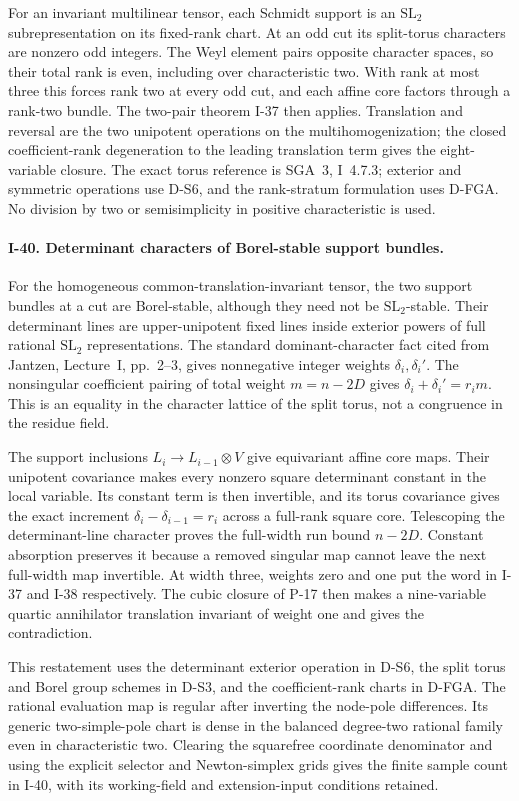For an invariant multilinear tensor, each Schmidt support is
an $\mathrm{SL}_2$ subrepresentation on its fixed-rank chart.
At an odd cut its split-torus characters are nonzero odd
integers. The Weyl element pairs opposite character spaces, so their total rank is even, including over characteristic two.
With rank at most three this forces rank two at every odd cut,
and each affine core factors through a rank-two bundle.
The two-pair theorem I-37 then applies. Translation and reversal
are the two unipotent operations on the multihomogenization;
the closed coefficient-rank degeneration to the leading
translation term gives the eight-variable closure. The exact
torus reference is SGA~3, I~4.7.3; exterior and symmetric
operations use D-S6, and the rank-stratum formulation uses
D-FGA. No division by two or semisimplicity in positive
characteristic is used.

\paragraph{I-40. Determinant characters of Borel-stable support bundles.}
For the homogeneous common-translation-invariant tensor, the
two support bundles at a cut are Borel-stable, although they
need not be $\mathrm{SL}_2$-stable. Their determinant lines
are upper-unipotent fixed lines inside exterior powers of
full rational $\mathrm{SL}_2$ representations. The standard
dominant-character fact cited from Jantzen, Lecture~I,
pp.~2--3, gives nonnegative integer weights $\delta_i,\delta_i'$.
The nonsingular coefficient pairing of total weight $m=n-2D$
gives $\delta_i+\delta_i'=r_i m$. This is an equality in the
character lattice of the split torus, not a congruence in
the residue field.

The support inclusions $L_i\to L_{i-1}\otimes V$ give
equivariant affine core maps. Their unipotent covariance
makes every nonzero square determinant constant in the local
variable. Its constant term is then invertible, and its
torus covariance gives the exact increment
$\delta_i-\delta_{i-1}=r_i$ across a full-rank square core.
Telescoping the determinant-line character proves the
full-width run bound $n-2D$. Constant absorption preserves
it because a removed singular map cannot leave the next
full-width map invertible. At width three, weights zero and
one put the word in I-37 and I-38 respectively. The cubic
closure of P-17 then makes a nine-variable quartic annihilator
translation invariant of weight one and gives the contradiction.

This restatement uses the determinant exterior operation in
D-S6, the split torus and Borel group schemes in D-S3, and
the coefficient-rank charts in D-FGA. The rational evaluation
map is regular after inverting the node-pole differences.
Its generic two-simple-pole chart is dense in the balanced
degree-two rational family even in characteristic two.
Clearing the squarefree coordinate denominator and using the
explicit selector and Newton-simplex grids gives the finite
sample count in I-40, with its working-field and extension-input
conditions retained.



